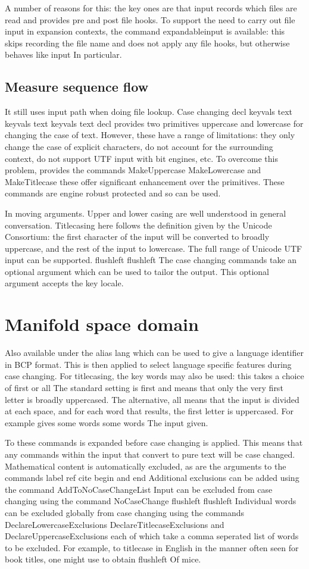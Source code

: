\documentclass{article}
\begin{document}
A number of reasons for this: the key ones are that input records which files are read and provides pre and post file hooks. To support the need to carry out file input in expansion contexts, the command expandableinput is available: this skips recording the file name and does not apply any file hooks, but otherwise behaves like input In particular.

\subsection{Measure sequence flow}
It still uses input path when doing file lookup. Case changing decl keyvals text keyvals text keyvals text decl provides two primitives uppercase and lowercase for changing the case of text. However, these have a range of limitations: they only change the case of explicit characters, do not account for the surrounding context, do not support UTF input with bit engines, etc. To overcome this problem, provides the commands MakeUppercase MakeLowercase and MakeTitlecase these offer significant enhancement over the primitives. These commands are engine robust protected and so can be used.

In moving arguments. Upper and lower casing are well understood in general conversation. Titlecasing here follows the definition given by the Unicode Consortium: the first character of the input will be converted to broadly uppercase, and the rest of the input to lowercase. The full range of Unicode UTF input can be supported. flushleft flushleft The case changing commands take an optional argument which can be used to tailor the output. This optional argument accepts the key locale.

\section{Manifold space domain}\label{sec13}
Also available under the alias lang which can be used to give a language identifier in BCP format. This is then applied to select language specific features during case changing. For titlecasing, the key words may also be used: this takes a choice of first or all The standard setting is first and means that only the very first letter is broadly uppercased. The alternative, all means that the input is divided at each space, and for each word that results, the first letter is uppercased. For example gives some words some words The input given.

To these commands is expanded before case changing is applied. This means that any commands within the input that convert to pure text will be case changed. Mathematical content is automatically excluded, as are the arguments to the commands label ref cite begin and end Additional exclusions can be added using the command AddToNoCaseChangeList Input can be excluded from case changing using the command NoCaseChange flushleft flushleft Individual words can be excluded globally from case changing using the commands DeclareLowercaseExclusions DeclareTitlecaseExclusions and DeclareUppercaseExclusions each of which take a comma seperated list of words to be excluded. For example, to titlecase in English in the manner often seen for book titles, one might use to obtain flushleft Of mice.
\end{document}
